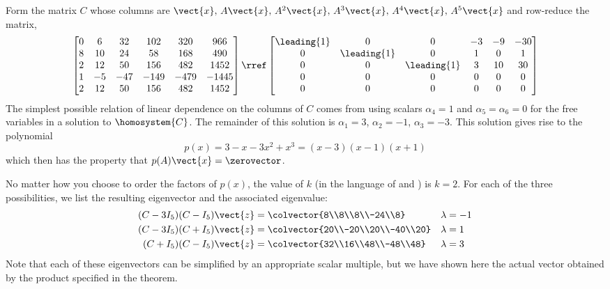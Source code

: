 Form the matrix $C$ whose columns are $\vect{x},\,A\vect{x},\,A^2\vect{x},\,A^3\vect{x},\,A^4\vect{x},\,A^5\vect{x}$ and row-reduce the matrix,
%
\begin{equation*}
\begin{bmatrix}
 0 & 6 & 32 & 102 & 320 & 966 \\
 8 & 10 & 24 & 58 & 168 & 490 \\
 2 & 12 & 50 & 156 & 482 & 1452 \\
 1 & -5 & -47 & -149 & -479 & -1445 \\
 2 & 12 & 50 & 156 & 482 & 1452
\end{bmatrix}
\rref
\begin{bmatrix}
 \leading{1} & 0 & 0 & -3 & -9 & -30 \\
 0 & \leading{1} & 0 & 1 & 0 & 1 \\
 0 & 0 & \leading{1} & 3 & 10 & 30 \\
 0 & 0 & 0 & 0 & 0 & 0 \\
 0 & 0 & 0 & 0 & 0 & 0
\end{bmatrix}
\end{equation*}
%
The simplest possible relation of linear dependence on the columns of $C$ comes from using scalars $\alpha_4=1$ and $\alpha_5=\alpha_6=0$ for the free variables in a solution to $\homosystem{C}$.  The remainder of this solution is $\alpha_1=3$, $\alpha_2=-1$, $\alpha_3=-3$.  This solution gives rise to the polynomial
%
\begin{equation*}
p(x)=3-x-3x^2+x^3=(x-3)(x-1)(x+1)
\end{equation*}
%
which then has the property that $p(A)\vect{x}=\zerovector$.\par
%
No matter how you choose to order the factors of $p(x)$, the value of $k$ (in the language of  and ) is $k=2$.  For each of the  three possibilities, we list the resulting eigenvector and the associated eigenvalue:
%
\begin{align*}
(C-3I_5)(C-I_5)\vect{z}&=\colvector{8\\8\\8\\-24\\8}&\lambda&=-1\\
(C-3I_5)(C+I_5)\vect{z}&=\colvector{20\\-20\\20\\-40\\20}&\lambda&=1\\
(C+I_5)(C-I_5)\vect{z}&=\colvector{32\\16\\48\\-48\\48}&\lambda&=3
\end{align*}
%
Note that each of these eigenvectors can be simplified by an appropriate scalar multiple, but we have shown here the actual vector obtained by the product specified in the theorem.
